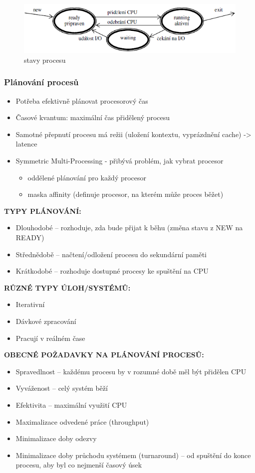 \documentclass[10pt,a4paper]{article}
\begin{document}
\begin{figure} [h]
		\includegraphics[scale=0.85]{img/stavy_procesu.png}
		\caption{stavy procesu}	
\end{figure}

\subsubsection{Plánování procesů}
\begin{itemize}
	\item Potřeba efektivně plánovat procesorový čas
	\item Časové kvantum: maximální čas přidělený procesu
	\item Samotné přepnutí procesu má režii (uložení kontextu, vyprázdnění cache) -> latence
	\item Symmetric Multi-Processing - přibývá problém, jak vybrat procesor
	\begin{itemize}
		\item oddělené plánování pro každý procesor
		\item maska affinity (definuje procesor, na kterém může proces běžet)
	\end{itemize}
\end{itemize}

\textbf{TYPY PLÁNOVÁNÍ:}
\begin{itemize}
	\item Dlouhodobé – rozhoduje, zda bude přijat k běhu (změna stavu z NEW na READY)
	\item Střednědobě – načtení/odložení procesu do sekundární paměti
	\item Krátkodobé – rozhoduje dostupné procesy ke spuštění na CPU
\end{itemize}

\textbf{RŮZNÉ TYPY ÚLOH/SYSTÉMŮ:}
\begin{itemize}
	\item Iterativní
	\item Dávkové zpracování
	\item Pracují v reálném čase
\end{itemize}

\textbf{OBECNÉ POŽADAVKY NA PLÁNOVÁNÍ PROCESŮ:}
\begin{itemize}
	\item Spravedlnost – každému procesu by v rozumné době měl být přidělen CPU
	\item Vyváženost – celý systém běží
	\item Efektivita – maximální využití CPU
	\item Maximalizace odvedené práce (throughput)
	\item Minimalizace doby odezvy
	\item Minimalizace doby průchodu systémem (turnaround) – od spuštění do konce procesu, aby byl co nejmenší časový úsek
\end{itemize}
\end{document}
